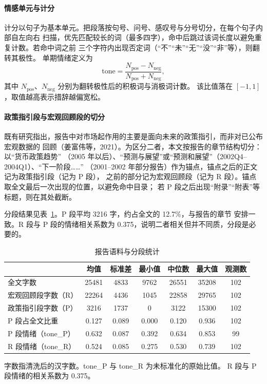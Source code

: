 \paragraph{情感单元与计分}
计分以句子为基本单元。把段落按句号、问号、感叹号与分号切分，在每个句子内部自左向右
扫描，优先匹配较长的词（最多四字），命中后跳过该词长度以避免重复计数。若命中词之前
三个字符内出现否定词（“不”“未”“无”“没”“非”等），则翻转其极性。
单期情绪定义为
\begin{equation}
\text{tone}=\frac{N_{\text{pos}}-N_{\text{neg}}}{N_{\text{pos}}+N_{\text{neg}}},
\end{equation}
其中 $N_{\text{pos}}$、$N_{\text{neg}}$ 分别为翻转极性后的积极词与消极词计数。
该比值落在 $[-1,1]$，取值越高表示措辞越偏宽松。

\paragraph{政策指引段与宏观回顾段的切分}
既有研究指出，报告中对市场起作用的主要是面向未来的政策指引，而非对已公布宏观数据的
回顾（姜富伟等，2021）。为区分二者，本文按报告的章节结构切分：以“货币政策趋势”
（2005 年以后）、“预测与展望”或“预测和展望”（2002Q4--2004Q1）、“下一阶段……”
（2001--2002 年部分报告）作为锚点，锚点之后的正文记为政策指引段（记为 P 段），
之前的部分记为宏观回顾段（记为 R 段）。锚点取全文最后一次出现的位置，以避免命中目录；
若 P 段之后出现“附录”“附表”等标题，则在其处截断。

分段结果见表~\ref{tab:corpus}。P 段平均 3216 字，约占全文的 12.7\%，与报告的章节
安排一致。R 段与 P 段的情绪相关系数为 0.375，说明二者相关但并不同质，分段是必要的。

\begin{table}[htbp]
\centering
\small
\begin{threeparttable}
\caption{报告语料与分段统计}
\label{tab:corpus}
\begin{tabular}{lcccccc}
\toprule
 & 均值 & 标准差 & 最小值 & 中位数 & 最大值 & 观测数 \\
\midrule
全文字数            & 25481 & 4833 & 9762  & 26551 & 35208 & 102 \\
宏观回顾段字数（R） & 22264 & 4436 & 1045  & 22858 & 29765 & 102 \\
政策指引段字数（P） & 3216  & 1737 & 0     & 3122  & 15300 & 102 \\
P 段占全文比重      & 0.127 & 0.089 & 0.000 & 0.120 & 0.936 & 102 \\
P 段情绪（tone\_P） & 0.632 & 0.087 & 0.392 & 0.634 & 0.853 & 99  \\
R 段情绪（tone\_R） & 0.524 & 0.085 & 0.275 & 0.530 & 0.739 & 102 \\
\bottomrule
\end{tabular}
\begin{tablenotes}[flushleft]
\footnotesize
\item 字数指清洗后的汉字数。tone\_P 与 tone\_R 为未标准化的原始比值。
R 段与 P 段情绪的相关系数为 0.375。
\end{tablenotes}
\end{threeparttable}
\end{table}

